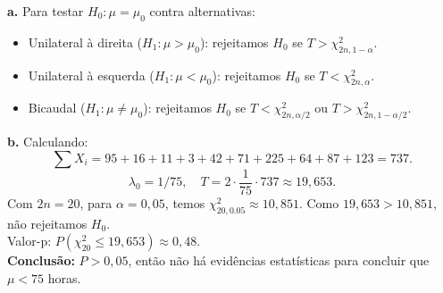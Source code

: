 \documentclass[12pt]{article}
\begin{document}
\textbf{a.} Para testar $H_0: \mu=\mu_0$ contra alternativas:
\begin{itemize}
    \item Unilateral à direita ($H_1: \mu > \mu_0$): rejeitamos $H_0$ se $T> \chi^2_{2n,1-\alpha}$.
    \item Unilateral à esquerda ($H_1: \mu < \mu_0$): rejeitamos $H_0$ se $T< \chi^2_{2n,\alpha}$.
    \item Bicaudal ($H_1: \mu \neq \mu_0$): rejeitamos $H_0$ se $T< \chi^2_{2n,\alpha/2}$ ou $T> \chi^2_{2n,1-\alpha/2}$.
\end{itemize}

\textbf{b.} Calculando:
\[
\sum X_i=95+16+11+3+42+71+225+64+87+123=737.
\]
\[
\lambda_0=1/75, \quad T=2\cdot \frac{1}{75}\cdot 737 \approx 19,653.
\]
Com $2n=20$, para $\alpha=0,05$, temos $\chi^2_{20,0.05} \approx 10,851$. Como $19,653>10,851$, não rejeitamos $H_0$.\\
Valor-p: $P(\chi^2_{20}\le 19,653)\approx 0,48$.\\

\textbf{Conclusão:} $P>0,05$, então não há evidências estatísticas para concluir que $\mu<75$ horas.
\end{document}
